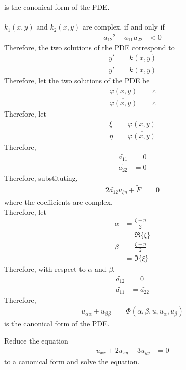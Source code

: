 \documentclass[titlepage, fleqn, a4paper, 12pt, twoside]{article}
\theoremstyle{definition}
\theoremstyle{theorem}
\renewcommand{\tilde}{\widetilde}
\begin{document}
is the canonical form of the PDE.\\
~\\
$k_1(x,y)$ and $k_2(x,y)$ are complex, if and only if
\begin{align*}
	{a_{1 2}}^2 - a_{1 1} a_{2 2} & < 0
\end{align*}
Therefore, the two solutions of the PDE correspond to
\begin{align*}
	y' & = k(x,y) \\
	y' & = \overline{k(x,y)}
\end{align*}
Therefore, let the two solutions of the PDE be
\begin{align*}
	\varphi(x,y)            & = c \\
	\overline{\varphi(x,y)} & = c
\end{align*}
Therefore, let
\begin{align*}
	\xi  & = \varphi(x,y) \\
	\eta & = \overline{\varphi(x,y)}
\end{align*}
Therefore,
\begin{align*}
	\tilde{a_{1 1}} & = 0 \\
	\tilde{a_{2 2}} & = 0
\end{align*}
Therefore, substituting,
\begin{align*}
	2 \tilde{a_{1 2}} u_{\xi \eta} + \tilde{F} & = 0
\end{align*}
where the coefficients are complex.\\
Therefore, let
\begin{align*}
	\alpha & = \frac{\xi + \eta}{2} \\
               & = \Re\{\xi\}           \\
	\beta  & = \frac{\xi - \eta}{2} \\
               & = \Im\{\xi\}
\end{align*}
Therefore, with respect to $\alpha$ and $\beta$,
\begin{align*}
	\tilde{a_{1 2}} & = 0 \\
	\tilde{a_{1 1}} & = \tilde{a_{2 2}}
\end{align*}
Therefore,
\begin{align*}
	u_{\alpha \alpha} + u_{\beta \beta} &= \Phi(\alpha,\beta,u,u_{\alpha},u_{\beta})
\end{align*}
is the canonical form of the PDE.

\begin{question}
	Reduce the equation
	\begin{align*}
		u_{x x} + 2 u_{x y} - 3 u_{y y} & = 0
	\end{align*}
	to a canonical form and solve the equation.
\end{question}
\end{document}
